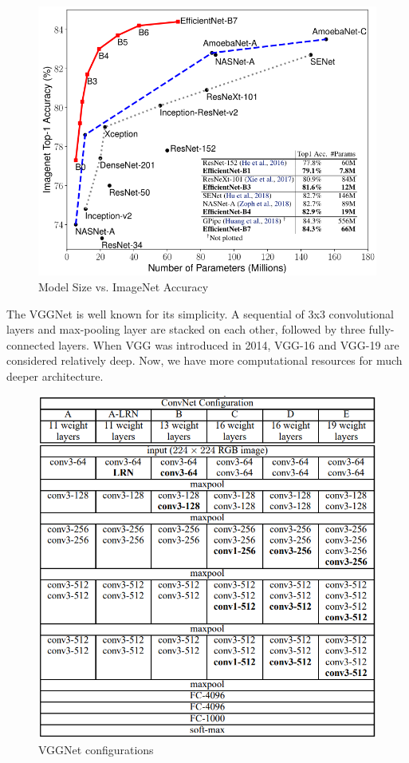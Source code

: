 \begin{figure}[H]
\centering
\includegraphics[scale=0.55]{figures/chapter_classification/efficient_net.png}
\caption{Model Size vs. ImageNet Accuracy \citep{tan2019efficientnet}}
\label{fig.efficient_net}
\end{figure}

The VGGNet is well known for its simplicity. A sequential of 3x3 convolutional layers and max-pooling layer are stacked on each other, followed by three fully-connected layers. When VGG was introduced in 2014, VGG-16 and VGG-19 are considered relatively deep. Now, we have more computational resources for much deeper architecture.

\begin{figure}[H]
\centering
\includegraphics[scale=0.5]{figures/chapter_classification/vggnet.png}
\caption{VGGNet configurations}
\label{fig.vgg_net}
\end{figure}

